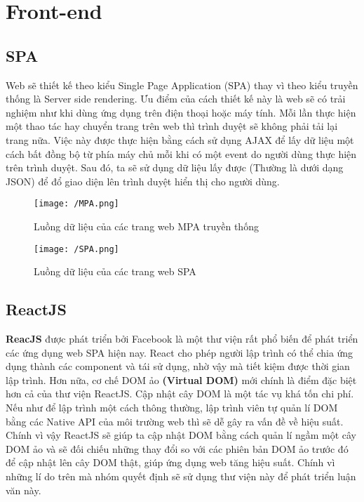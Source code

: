 \section{Front-end}
	\subsection{SPA}
		 Web sẽ thiết kế theo kiểu Single Page Application (SPA) thay vì theo kiểu truyền thống là Server side rendering. Ưu điểm của cách thiết kế này là web sẽ có trải nghiệm như khi dùng ứng dụng trên điện thoại hoặc máy tính. Mỗi lần thực hiện một thao tác hay chuyển trang trên web thì trình duyệt sẽ không phải tải lại trang nữa. Việc này được thực hiện bằng cách sử dụng AJAX để lấy dữ liệu một cách bất đồng bộ từ phía máy chủ mỗi khi có một event do người dùng thực hiện trên trình duyệt. Sau đó, ta sẽ sử dụng dữ liệu lấy được (Thường là dưới dạng JSON) để đổ giao diện lên trình duyệt hiển thị cho người dùng.
		 
		 \begin{figure}[H]
		 	\texttt{[image: /MPA.png]}
		 	\centering
		 	\linebreak
		 	\caption{Luồng dữ liệu của các trang web MPA truyền thống}
		 \end{figure}
		 
		 \begin{figure}[H]
		 	\texttt{[image: /SPA.png]}
		 	\centering
		 	\linebreak
		 	\caption{Luồng dữ liệu của các trang web SPA}
		 \end{figure}
    
	\subsection{ReactJS}
		\textbf{ReacJS} được phát triển bởi Facebook là một thư viện rất phổ biến để phát triển các ứng dụng web SPA hiện nay. React cho phép người lập trình có thể chia ứng dụng thành các component và tái sử dụng, nhờ vậy mà tiết kiệm được thời gian lập trình. Hơn nữa, cơ chế DOM ảo \textbf{(Virtual DOM)} mới chính là điểm đặc biệt hơn cả của thư viện ReactJS. Cập nhật cây DOM là một tác vụ khá tốn chi phí. Nếu như để lập trình một cách thông thường, lập trình viên tự quản lí DOM bằng các Native API của môi trường web thì sẽ dễ gây ra vấn đề về hiệu suất. Chính vì vậy ReactJS sẽ giúp ta cập nhật DOM bằng cách quản lí ngầm một cây DOM ảo và sẽ đối chiếu những thay đổi so với các phiên bản DOM ảo trước đó để cập nhật lên cây DOM thật, giúp ứng dụng web tăng hiệu suất. Chính vì những lí do trên mà nhóm quyết định sẽ sử dụng thư viện này để phát triển luận văn này.\\
		
